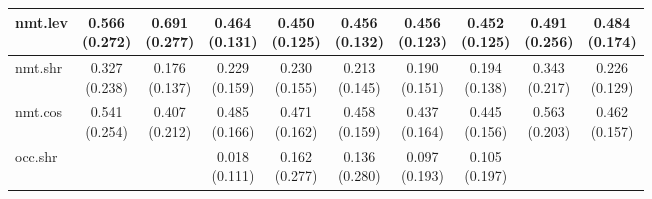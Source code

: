 \documentclass[epsfig,a4paper,11pt,titlepage,twoside,openany]{book}
\begin{document}
\begin{table}[H]
\begin{tabular}{l|c|c|c|c|c|c|c|c|c|}
\multicolumn{1}{|l|}{nmt.lev}            & \makecell{0.566 \\ (0.272)}  & \makecell{0.691 \\ (0.277)} & \makecell{0.464 \\ (0.131)} & \makecell{0.450 \\ (0.125)} & \makecell{0.456 \\ (0.132)} & \makecell{0.456 \\ (0.123)} & \makecell{0.452 \\ (0.125)} & \makecell{0.491 \\ (0.256)}    & \makecell{0.484 \\ (0.174)}   \\ \hline
\multicolumn{1}{|l|}{nmt.shr}                 & \makecell{0.327 \\ (0.238)}  & \makecell{0.176 \\ (0.137)} & \makecell{0.229 \\ (0.159)} & \makecell{0.230 \\ (0.155)} & \makecell{0.213 \\ (0.145)} & \makecell{0.190 \\ (0.151)} & \makecell{0.194 \\ (0.138)} & \makecell{0.343 \\ (0.217)}    & \makecell{0.226 \\ (0.129)}   \\ \hline
\multicolumn{1}{|l|}{nmt.cos} & \makecell{0.541 \\ (0.254)}  & \makecell{0.407 \\ (0.212)} & \makecell{0.485 \\ (0.166)} & \makecell{0.471 \\ (0.162)} & \makecell{0.458 \\ (0.159)} & \makecell{0.437 \\ (0.164)} & \makecell{0.445 \\ (0.156)} & \makecell{0.563 \\ (0.203)}    & \makecell{0.462 \\ (0.157)}   \\ \hline
\multicolumn{1}{|l|}{occ.shr}                  &               &              & \makecell{0.018 \\ (0.111)} & \makecell{0.162 \\ (0.277)} & \makecell{0.136 \\ (0.280)} & \makecell{0.097 \\ (0.193)} & \makecell{0.105 \\ (0.197)} &                 &                \\ \hline

\end{tabular}
\end{table}
\end{document}
